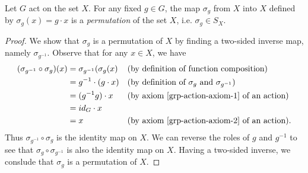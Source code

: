 \begin{prop}\label{sigma-is-a-permutation}
Let $G$ act on the set $X$.  For any fixed $g \in G$, the map $\sigma_g$ from $X$ into $X$ defined by $\sigma_g (x) = g \cdot x$ is a \textit{permutation} of the set $X$, i.e. $\sigma_g \in S_X$.
\end{prop}
\begin{proof}
We show that $\sigma_g$ is a permutation of $X$ by finding a two-sided inverse map, namely $\sigma_{g^{-1}}$. Observe that for any $x \in X$, we have
\begin{align*}
(\sigma_{g^{-1}} \circ \sigma_g) (x) &= \sigma_{g^{-1}} ( \sigma_g (x) && \text{(by definition of function composition)} \\
					&= g^{-1} \cdot (g \cdot x) && \text{(by definition of $\sigma_g$ and $\sigma_{g^{-1}}$)} \\
					&= (g^{-1}g) \cdot x &&\text{(by axiom \ref{grp-action-axiom-1} of an action)} \\
					&= id_G \cdot x \\
					&= x &&\text{(by axiom \ref{grp-action-axiom-2} of an action)}.
\end{align*}
Thus $\sigma_{g^{-1}} \circ \sigma_g$ is the identity map on $X$. We can reverse the roles of $g$ and $g^{-1}$ to see that $\sigma_g \circ \sigma_{g^{-1}}$ is also the identity map on $X$.  Having a two-sided inverse, we conslude that $\sigma_g$ is a permutation of $X$.
\end{proof}

